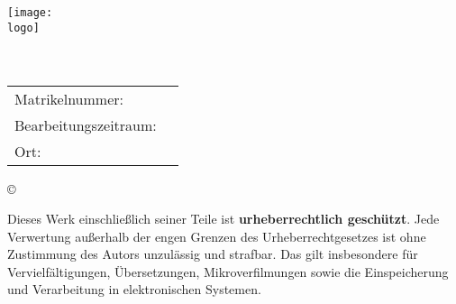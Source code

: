 
\thispagestyle{plain}

\begin{titlepage}
	\begin{center}
		\texttt{[image: \\logo]}\\[2ex]
		
		\huge{\textsc{\textbf{\titel}}}\\[4ex]
		\LARGE{\textbf{\untertitel}}\\[1ex]
		
		\vspace{19ex}
		
		\normalsize
		\begin{tabular}[c]{l l}
			 Matrikelnummer: & \matrikelnr\\[1.2ex]
			 
			 Bearbeitungszeitraum: & \quad \datum\\[1.2ex]
			 Ort: & \quad \ort\\[1.2ex]
		\end{tabular}
		
		\copyright\ \jahr\\[1.5ex]
	
	\end{center}
	
	\singlespacing
	\small
	\noindent Dieses Werk einschließlich seiner Teile ist \textbf{urheberrechtlich geschützt}. Jede Verwertung außerhalb der engen Grenzen des Urheberrechtgesetzes ist ohne Zustimmung des Autors unzulässig und strafbar. Das gilt insbesondere für Vervielfältigungen, Übersetzungen, Mikroverfilmungen sowie die Einspeicherung und Verarbeitung in elektronischen Systemen.

\end{titlepage}

\restoregeometry 
